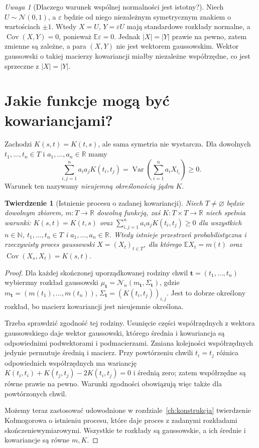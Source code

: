 \documentclass[11pt,a4paper,oneside]{report}
\numberwithin{equation}{chapter}
\theoremstyle{plain}
\newtheorem{twierdzenie}{Twierdzenie}[chapter]
\theoremstyle{definition}
\theoremstyle{remark}
\newtheorem{uwaga}{Uwaga}[chapter]
\newcommand{\R}{\mathbb{R}}
\newcommand{\N}{\mathbb{N}}
\newcommand{\E}{\mathbb{E}}
\newcommand{\Var}{\operatorname{Var}}
\newcommand{\Cov}{\operatorname{Cov}}
\newcommand{\Normal}{\mathcal{N}}
\begin{document}
\begin{uwaga}[Dlaczego warunek wspólnej normalności jest istotny?]
Niech $U\sim\Normal(0,1)$, a $\varepsilon$ będzie od niego
niezależnym symetrycznym znakiem o wartościach $\pm1$.
Wtedy $X=U$, $Y=\varepsilon U$ mają standardowe rozkłady normalne,
a $\Cov(X,Y)=0$, ponieważ $\E\varepsilon=0$.
Jednak $|X|=|Y|$ prawie na pewno, zatem zmienne są zależne,
a para $(X,Y)$ nie jest wektorem gaussowskim.
Wektor gaussowski o takiej macierzy kowariancji miałby niezależne
współrzędne, co jest sprzeczne z $|X|=|Y|$.
\end{uwaga}

\section{Jakie funkcje mogą być kowariancjami?}
Zachodzi $K(s,t)=K(t,s)$, ale sama symetria nie wystarcza.
Dla dowolnych $t_1,\ldots,t_n\in T$ i $a_1,\ldots,a_n\in\R$
mamy
\[
\sum_{i,j=1}^n a_i a_jK(t_i,t_j)
=\Var\left(\sum_{i=1}^n a_iX_{t_i}\right)\ge0.
\]
Warunek ten nazywamy \emph{nieujemną określonością jądra} $K$.

\begin{twierdzenie}[Istnienie procesu o zadanej kowariancji]
Niech $T\ne\varnothing$ będzie dowolnym zbiorem,
$m:T\to\R$ dowolną funkcją, zaś $K:T\times T\to\R$
niech spełnia warunki: $K(s,t)=K(t,s)$ oraz
$\sum_{i,j=1}^n a_i a_jK(t_i,t_j)\ge0$ dla wszystkich
$n\in\N$, $t_1,\ldots,t_n\in T$ i $a_1,\ldots,a_n\in\R$.
Wtedy istnieje przestrzeń probabilistyczna i rzeczywisty proces
gaussowski $X=(X_t)_{t\in T}$, dla którego
$\E X_t=m(t)$ oraz $\Cov(X_s,X_t)=K(s,t)$.
\end{twierdzenie}
\begin{proof}
Dla każdej skończonej uporządkowanej rodziny chwil
$\mathbf t=(t_1,\ldots,t_n)$ wybierzmy rozkład gaussowski
$\mu_{\mathbf t}=\Normal_n(m_{\mathbf t},\Sigma_{\mathbf t})$,
gdzie $m_{\mathbf t}=(m(t_1),\ldots,m(t_n))$,
$\Sigma_{\mathbf t}=(K(t_i,t_j))_{i,j}$. Jest to dobrze określony
rozkład, bo macierz kowariancji jest nieujemnie określona.

Trzeba sprawdzić zgodność tej rodziny. Usunięcie części współrzędnych
z wektora gaussowskiego daje wektor gaussowski, którego średnia i
kowariancja są odpowiednimi podwektorami i podmacierzami.
Zmiana kolejności współrzędnych jedynie permutuje średnią i macierz.
Przy powtórzeniu chwili $t_i=t_j$ różnica odpowiednich współrzędnych
ma wariancję $K(t_i,t_i)+K(t_j,t_j)-2K(t_i,t_j)=0$ i średnią zero;
zatem współrzędne są równe prawie na pewno.
Warunki zgodności obowiązują więc także dla powtórzonych chwil.

Możemy teraz zastosować udowodnione w rozdziale~\ref{ch:konstrukcja}
twierdzenie Kołmogorowa o istnieniu procesu, które daje proces
z zadanymi rozkładami skończeniewymiarowymi. Wszystkie te rozkłady
są gaussowskie, a ich średnie i kowariancje są równe $m,K$.
\end{proof}
\end{document}
